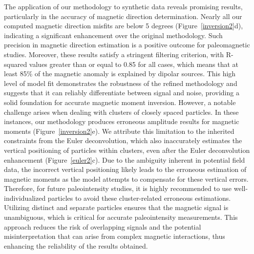 The application of our methodology to synthetic data reveals promising results, particularly in the accuracy of magnetic direction determination. Nearly all our computed magnetic direction misfits are below 5 degrees (Figure~\ref{inversion2}d), indicating a significant enhancement over the original methodology. Such precision in magnetic direction estimation is a positive outcome for paleomagnetic studies. Moreover, these results satisfy a stringent filtering criterion, with R-squared values greater than or equal to 0.85 for all cases, which means that at least 85\% of the magnetic anomaly is explained by dipolar sources. This high level of model fit demonstrates the robustness of the refined methodology and suggests that it can reliably differentiate between signal and noise, providing a solid foundation for accurate magnetic moment inversion. However, a notable challenge arises when dealing with clusters of closely spaced particles. In these instances, our methodology produces erroneous amplitude results for magnetic moments (Figure~\ref{inversion2}e). We attribute this limitation to the inherited constraints from the Euler deconvolution, which also inaccurately estimates the vertical positioning of particles within clusters, even after the Euler deconvolution enhancement (Figure~\ref{euler2}c). Due to the ambiguity inherent in potential field data, the incorrect vertical positioning likely leads to the erroneous estimation of magnetic moments as the model attempts to compensate for these vertical errors. Therefore, for future paleointensity studies, it is highly recommended to use well-individualized particles to avoid these cluster-related erroneous estimations. Utilizing distinct and separate particles ensures that the magnetic signal is unambiguous, which is critical for accurate paleointensity measurements. This approach reduces the risk of overlapping signals and the potential misinterpretation that can arise from complex magnetic interactions, thus enhancing the reliability of the results obtained.

